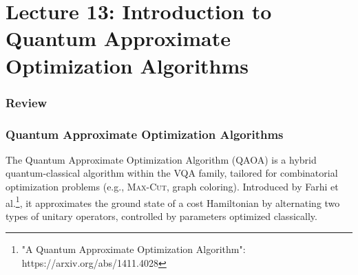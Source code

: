 \section{Lecture 13: Introduction to Quantum Approximate Optimization
Algorithms}\label{sec:lecture13}

\subsubsection*{Review}







\subsubsection*{Quantum Approximate Optimization Algorithms}

The Quantum Approximate Optimization Algorithm (QAOA) is a hybrid
quantum-classical algorithm within the VQA family, tailored for combinatorial
optimization problems (e.g., \textsc{Max-Cut}, graph coloring). Introduced by
Farhi et al.\footnote{"A Quantum Approximate Optimization Algorithm":
https://arxiv.org/abs/1411.4028}, it approximates the ground state of a cost
Hamiltonian by alternating two types of unitary operators, controlled by
parameters optimized classically.

\vspace{0.3cm}


